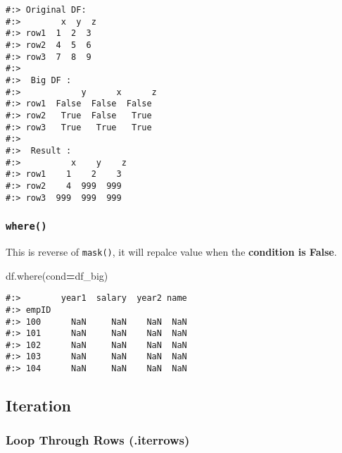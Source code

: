 \documentclass[
]{book}
\newenvironment{Shaded}{\begin{snugshade}}{\end{snugshade}}
\newcommand{\NormalTok}[1]{#1}
\newcommand{\OperatorTok}[1]{\textcolor[rgb]{0.43,0.43,0.43}{\textbf{#1}}}
\begin{document}
\begin{verbatim}
#:> Original DF: 
#:>        x  y  z
#:> row1  1  2  3
#:> row2  4  5  6
#:> row3  7  8  9 
#:> 
#:>  Big DF : 
#:>            y      x      z
#:> row1  False  False  False
#:> row2   True  False   True
#:> row3   True   True   True 
#:> 
#:>  Result : 
#:>          x    y    z
#:> row1    1    2    3
#:> row2    4  999  999
#:> row3  999  999  999
\end{verbatim}

\hypertarget{where-1}{%
\subsubsection{\texorpdfstring{\texttt{where()}}{where()}}\label{where-1}}

This is reverse of \texttt{mask()}, it will repalce value when the \textbf{condition is False}.

\begin{Shaded}
\begin{Highlighting}[]
\NormalTok{df.where(cond}\OperatorTok{=}\NormalTok{df\_big)}
\end{Highlighting}
\end{Shaded}

\begin{verbatim}
#:>        year1  salary  year2 name
#:> empID                           
#:> 100      NaN     NaN    NaN  NaN
#:> 101      NaN     NaN    NaN  NaN
#:> 102      NaN     NaN    NaN  NaN
#:> 103      NaN     NaN    NaN  NaN
#:> 104      NaN     NaN    NaN  NaN
\end{verbatim}

\hypertarget{iteration}{%
\subsection{Iteration}\label{iteration}}

\hypertarget{loop-through-rows-.iterrows}{%
\subsubsection{Loop Through Rows (.iterrows)}\label{loop-through-rows-.iterrows}}
\end{document}
